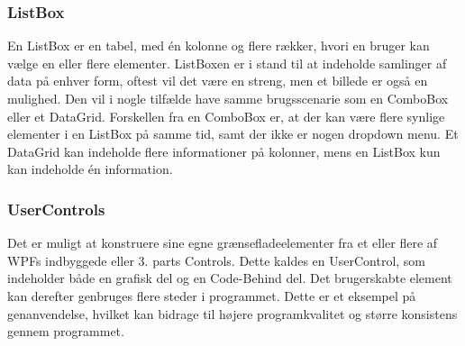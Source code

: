 \subsubsection*{ListBox}
En ListBox er en tabel, med én kolonne og flere rækker, hvori en bruger kan vælge en eller flere elementer.
ListBoxen er i stand til at indeholde samlinger af data på enhver form, oftest vil det være en streng, men et billede er også en mulighed.
Den vil i nogle tilfælde have samme brugsscenarie som en ComboBox eller et DataGrid. 
Forskellen fra en ComboBox er, at der kan være flere synlige elementer i en ListBox på samme tid, samt der ikke er nogen dropdown menu.
Et DataGrid kan indeholde flere informationer på kolonner, mens en ListBox kun kan indeholde én information.

\subsubsection*{UserControls}
Det er muligt at konstruere sine egne grænsefladeelementer fra et eller flere af WPFs indbyggede eller 3. parts Controls.
Dette kaldes en UserControl, som indeholder både en grafisk del og en Code-Behind del.
Det brugerskabte element kan derefter genbruges flere steder i programmet.
Dette er et eksempel på genanvendelse, hvilket kan bidrage til højere programkvalitet og større konsistens gennem programmet. 

